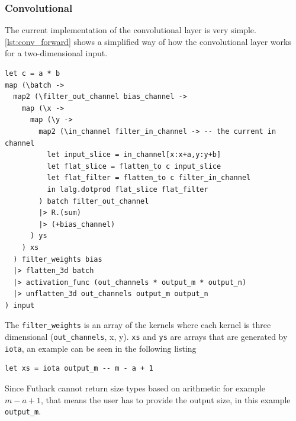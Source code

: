 \subsubsection{Convolutional}
\label{ssub:impl_conv}

The current implementation of the convolutional layer is very simple. \autoref{lst:conv_forward} shows a simplified way of how the convolutional layer works for a two-dimensional input.

\begin{lstlisting}[label={lst:conv_forward}, caption=A simplified forward function for the 2d convolutional layer. Where \texttt{a} and \texttt{b} are the sizes of the kernel.]
let c = a * b
map (\batch ->
  map2 (\filter_out_channel bias_channel ->
    map (\x ->
      map (\y ->
        map2 (\in_channel filter_in_channel -> -- the current in channel
          let input_slice = in_channel[x:x+a,y:y+b]
          let flat_slice = flatten_to c input_slice
          let flat_filter = flatten_to c filter_in_channel
          in lalg.dotprod flat_slice flat_filter
        ) batch filter_out_channel
        |> R.(sum)
        |> (+bias_channel)
      ) ys
    ) xs
  ) filter_weights bias
  |> flatten_3d batch
  |> activation_func (out_channels * output_m * output_n)
  |> unflatten_3d out_channels output_m output_n
) input
\end{lstlisting}

The \texttt{filter\_weights} is an array of the kernels where each kernel is three dimensional (\texttt{out\_channels}, x, y).
\texttt{xs} and \texttt{ys} are arrays that are generated by \texttt{iota}, an example can be seen in the following listing

\begin{lstlisting}
let xs = iota output_m -- m - a + 1
\end{lstlisting}

Since Futhark cannot return size types based on arithmetic for example $m - a + 1$, that means the user has to provide the output size, in this example \texttt{output\_m}.

